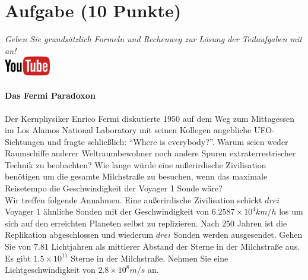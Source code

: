 \documentclass[a4paper, 9pt]{scrartcl}\usepackage[]{graphicx}\usepackage[]{xcolor}
\begin{document}
 
\clearpage

\section{Aufgabe \hfill (10 Punkte)}

\textit{Geben Sie grunds{\"a}tzlich Formeln und Rechenweg zur L{\"o}sung der
  Teilaufgaben mit an!} \\[1Ex]

\hfill\href{https://youtu.be/iCQogS6KhPM}{\includegraphics[width =
  2cm]{img/youtube}} %
\hspace{2Ex}

\paragraph{Das Fermi Paradoxon}



Der Kernphysiker Enrico Fermi diskutierte 1950 auf dem Weg zum Mittagessen
im Los Alamos National Laboratory mit seinen Kollegen angebliche
UFO-Sichtungen und fragte schlie{\ss}lich: "`Where is everybody?"'. Warum seien
weder Raumschiffe anderer Weltraumbewohner noch andere Spuren
extraterrestrischer Technik zu beobachten? Wie lange w{\"u}rde eine au{\ss}erirdische
Zivilisation ben{\"o}tigen um die gesamte Milchstra{\ss}e zu
besuchen, wenn das maximale Reisetempo die Geschwindigkeit der Voyager 1 Sonde w{\"a}re?\\[-1ex]

Wir treffen folgende Annahmen. Eine au{\ss}erirdische Zivilisation schickt $drei$
Voyager 1 {\"a}hnliche Sonden mit der Geschwindigkeit von $\ensuremath{6.2587\times 10^{4}}km/h$
los um sich auf den erreichten Planeten selbst zu replizieren. Nach
$250$ Jahren ist die Replikation abgeschlossen und wiederum
$drei$ Sonden werden ausgesendet. Gehen Sie von
$7.81$ Lichtjahren als mittlerer Abstand der Sterne in der
Milchstra{\ss}e aus. Es gibt $\ensuremath{1.5\times 10^{11}}$ Sterne in der Milchstra{\ss}e. Nehmen
Sie eine Lichtgeschwindigkeit von $\ensuremath{2.8\times 10^{8}}m/s$ an.
\end{document}
